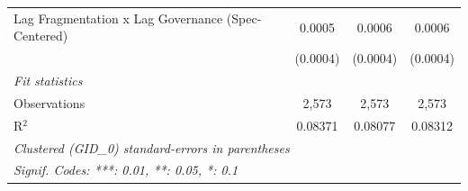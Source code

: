 \begin{table}[H]
\begin{tabular}{lccc}
      Lag Fragmentation x Lag Governance (Spec-Centered) & 0.0005                      & 0.0006                           & 0.0006\\   
                                                         & (0.0004)                    & (0.0004)                         & (0.0004)\\   
      \midrule
      \emph{Fit statistics}\\
      Observations                                       & 2,573                       & 2,573                            & 2,573\\  
      R$^2$                                              & 0.08371                     & 0.08077                          & 0.08312\\  
      \midrule \midrule
      \multicolumn{4}{l}{\emph{Clustered (GID\_0) standard-errors in parentheses}}\\
      \multicolumn{4}{l}{\emph{Signif. Codes: ***: 0.01, **: 0.05, *: 0.1}}\\
   \end{tabular}
\end{table}


